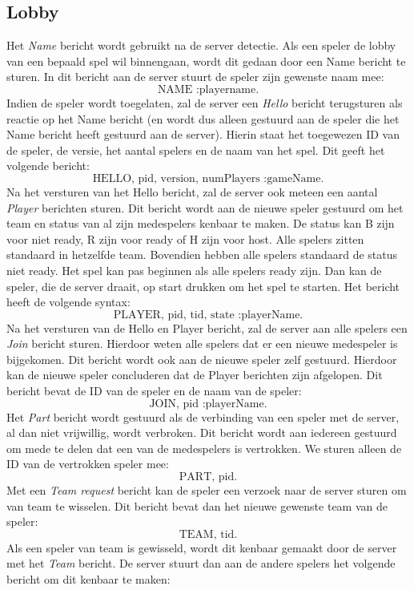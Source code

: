 \documentclass[a4paper,11pt]{article}
\begin{document}
    \subsection{Lobby}
    Het \emph{Name} bericht wordt gebruikt na de server detectie. Als een speler de lobby van een bepaald spel wil binnengaan, wordt dit gedaan door een Name bericht te sturen. In dit bericht aan de server stuurt de speler zijn gewenste naam mee:
    \[
    \text{NAME :playername.}
    \]
    Indien de speler wordt toegelaten, zal de server een \emph{Hello} bericht terugsturen als reactie op het Name bericht (en wordt dus alleen gestuurd aan de speler die het Name bericht heeft gestuurd aan de server). Hierin staat het toegewezen ID van de speler, de versie, het aantal spelers en de naam van het spel. Dit geeft het volgende bericht:
    \[
    \text{HELLO, pid, version, numPlayers :gameName.}
    \]
    Na het versturen van het Hello bericht, zal de server ook meteen een aantal \emph{Player} berichten sturen. Dit bericht wordt aan de nieuwe speler gestuurd om het team en status van al zijn medespelers kenbaar te maken. De status kan B zijn voor niet ready, R zijn voor ready of H zijn voor host. Alle spelers zitten standaard in hetzelfde team. Bovendien hebben alle spelers standaard de status niet ready. Het spel kan pas beginnen als alle spelers ready zijn. Dan kan de speler, die de server draait, op start drukken om het spel te starten. Het bericht heeft de volgende syntax:
    \[
    \text{PLAYER, pid, tid, state :playerName.}
    \]
    Na het versturen van de Hello en Player bericht, zal de server aan alle spelers een \emph{Join} bericht sturen. Hierdoor weten alle spelers dat er een nieuwe medespeler is bijgekomen. Dit bericht wordt ook aan de nieuwe speler zelf gestuurd. Hierdoor kan de nieuwe speler concluderen dat de Player berichten zijn afgelopen. Dit bericht bevat de ID van de speler en de naam van de speler:
    \[
    \text{JOIN, pid :playerName.}
    \]
    Het \emph{Part} bericht wordt gestuurd als de verbinding van een speler met de server, al dan niet vrijwillig, wordt verbroken. Dit bericht wordt aan iedereen gestuurd om mede te delen dat een van de medespelers is vertrokken. We sturen alleen de ID van de vertrokken speler mee:
    \[
    \text{PART, pid.}
    \]
    Met een \emph{Team request} bericht kan de speler een verzoek naar de server sturen om van team te wisselen. Dit bericht bevat dan het nieuwe gewenste team van de speler:
    \[
    \text{TEAM, tid.}
    \]
    Als een speler van team is gewisseld, wordt dit kenbaar gemaakt door de server met het \emph{Team} bericht. De server stuurt dan aan de andere spelers het volgende bericht om dit kenbaar te maken:
\end{document}
